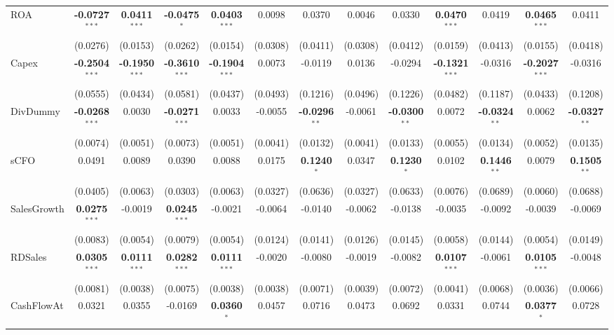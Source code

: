 \documentclass[11pt,a4paper]{article}
\begin{document}
\begin{table}[htbp]
\begin{tabular}{lcccccccccccc}
ROA & \textbf{-0.0727}$^{***}$ & \textbf{0.0411}$^{***}$ & \textbf{-0.0475}$^{*}$ & \textbf{0.0403}$^{***}$ & 0.0098 & 0.0370 & 0.0046 & 0.0330 & \textbf{0.0470}$^{***}$ & 0.0419 & \textbf{0.0465}$^{***}$ & 0.0411 \\
 & (0.0276) & (0.0153) & (0.0262) & (0.0154) & (0.0308) & (0.0411) & (0.0308) & (0.0412) & (0.0159) & (0.0413) & (0.0155) & (0.0418) \\
Capex & \textbf{-0.2504}$^{***}$ & \textbf{-0.1950}$^{***}$ & \textbf{-0.3610}$^{***}$ & \textbf{-0.1904}$^{***}$ & 0.0073 & -0.0119 & 0.0136 & -0.0294 & \textbf{-0.1321}$^{***}$ & -0.0316 & \textbf{-0.2027}$^{***}$ & -0.0316 \\
 & (0.0555) & (0.0434) & (0.0581) & (0.0437) & (0.0493) & (0.1216) & (0.0496) & (0.1226) & (0.0482) & (0.1187) & (0.0433) & (0.1208) \\
DivDummy & \textbf{-0.0268}$^{***}$ & 0.0030 & \textbf{-0.0271}$^{***}$ & 0.0033 & -0.0055 & \textbf{-0.0296}$^{**}$ & -0.0061 & \textbf{-0.0300}$^{**}$ & 0.0072 & \textbf{-0.0324}$^{**}$ & 0.0062 & \textbf{-0.0327}$^{**}$ \\
 & (0.0074) & (0.0051) & (0.0073) & (0.0051) & (0.0041) & (0.0132) & (0.0041) & (0.0133) & (0.0055) & (0.0134) & (0.0052) & (0.0135) \\
sCFO & 0.0491 & 0.0089 & 0.0390 & 0.0088 & 0.0175 & \textbf{0.1240}$^{*}$ & 0.0347 & \textbf{0.1230}$^{*}$ & 0.0102 & \textbf{0.1446}$^{**}$ & 0.0079 & \textbf{0.1505}$^{**}$ \\
 & (0.0405) & (0.0063) & (0.0303) & (0.0063) & (0.0327) & (0.0636) & (0.0327) & (0.0633) & (0.0076) & (0.0689) & (0.0060) & (0.0688) \\
SalesGrowth & \textbf{0.0275}$^{***}$ & -0.0019 & \textbf{0.0245}$^{***}$ & -0.0021 & -0.0064 & -0.0140 & -0.0062 & -0.0138 & -0.0035 & -0.0092 & -0.0039 & -0.0069 \\
 & (0.0083) & (0.0054) & (0.0079) & (0.0054) & (0.0124) & (0.0141) & (0.0126) & (0.0145) & (0.0058) & (0.0144) & (0.0054) & (0.0149) \\
RDSales & \textbf{0.0305}$^{***}$ & \textbf{0.0111}$^{***}$ & \textbf{0.0282}$^{***}$ & \textbf{0.0111}$^{***}$ & -0.0020 & -0.0080 & -0.0019 & -0.0082 & \textbf{0.0107}$^{***}$ & -0.0061 & \textbf{0.0105}$^{***}$ & -0.0048 \\
 & (0.0081) & (0.0038) & (0.0075) & (0.0038) & (0.0038) & (0.0071) & (0.0039) & (0.0072) & (0.0041) & (0.0068) & (0.0036) & (0.0066) \\
CashFlowAt & 0.0321 & 0.0355 & -0.0169 & \textbf{0.0360}$^{*}$ & 0.0457 & 0.0716 & 0.0473 & 0.0692 & 0.0331 & 0.0744 & \textbf{0.0377}$^{*}$ & 0.0728 \\

\end{tabular}
\end{table}
\end{document}
